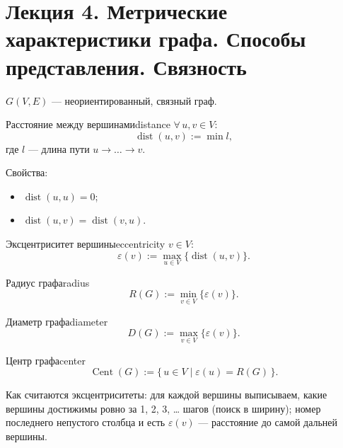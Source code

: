 \chapter{Лекция 4. Метрические характеристики графа. Способы представления. Связность}


$G(V, E)$ --- неориентированный, связный граф.

\begin{defn}{Расстояние между вершинами}{distance}
$\forall\, u, v \in V$:
\[
  \operatorname{dist}(u, v) := \min l,
\]
где $l$ --- длина пути $u \to \ldots \to v$.

Свойства:
\begin{itemize}
  \item $\operatorname{dist}(u, u) = 0$;
  \item $\operatorname{dist}(u, v) = \operatorname{dist}(v, u)$.
\end{itemize}
\end{defn}

\begin{defn}{Эксцентриситет вершины}{eccentricity}
$v \in V$:
\[
  \varepsilon(v) := \max_{u \in V} \bigl\{\operatorname{dist}(u, v)\bigr\}.
\]
\end{defn}

\begin{defn}{Радиус графа}{radius}
\[
  R(G) := \min_{v \in V} \bigl\{\varepsilon(v)\bigr\}.
\]
\end{defn}

\begin{defn}{Диаметр графа}{diameter}
\[
  D(G) := \max_{v \in V} \bigl\{\varepsilon(v)\bigr\}.
\]
\end{defn}

\begin{defn}{Центр графа}{center}
\[
  \operatorname{Cent}(G) := \bigl\{\, u \in V \;\big|\; \varepsilon(u) = R(G) \,\bigr\}.
\]
\end{defn}

\bigskip

Как считаются эксцентриситеты: для каждой вершины выписываем, какие
вершины достижимы ровно за 1, 2, 3, \dots{} шагов (поиск в ширину);
номер последнего непустого столбца и есть $\varepsilon(v)$ ---
расстояние до самой дальней вершины.

